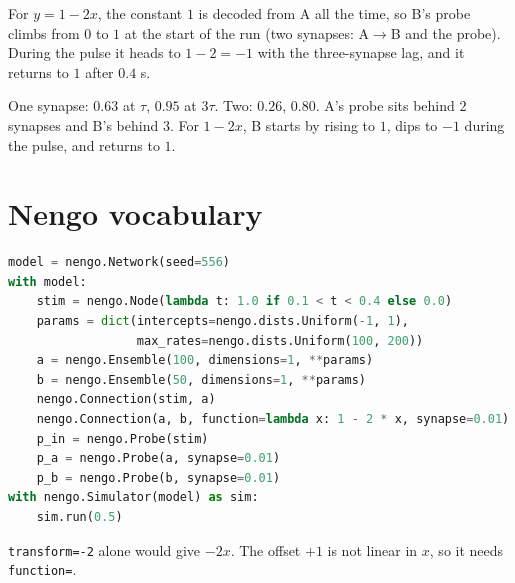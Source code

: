 \documentclass[11pt,letterpaper]{article}
\newcommand{\ans}[1]{\par\vspace{4pt}{\bfseries #1}\quad}
\begin{document}
For $y = 1 - 2x$, the constant $1$ is decoded from A all the time, so B's probe climbs from $0$ to $1$ at the start of the run (two synapses: A$\to$B and the probe). During the pulse it heads to $1 - 2 = -1$ with the three-synapse lag, and it returns to $1$ after $0.4$ s.
\begin{center}
\end{center}
\begin{result}
One synapse: $0.63$ at $\tau$, $0.95$ at $3\tau$. Two: $0.26$, $0.80$. A's probe sits behind $2$ synapses and B's behind $3$. For $1 - 2x$, B starts by rising to $1$, dips to $-1$ during the pulse, and returns to $1$.
\end{result}

\section{Nengo vocabulary}

\ans{Q1}
\begin{lstlisting}[language=Python]
model = nengo.Network(seed=556)
with model:
    stim = nengo.Node(lambda t: 1.0 if 0.1 < t < 0.4 else 0.0)
    params = dict(intercepts=nengo.dists.Uniform(-1, 1),
                  max_rates=nengo.dists.Uniform(100, 200))
    a = nengo.Ensemble(100, dimensions=1, **params)
    b = nengo.Ensemble(50, dimensions=1, **params)
    nengo.Connection(stim, a)
    nengo.Connection(a, b, function=lambda x: 1 - 2 * x, synapse=0.01)
    p_in = nengo.Probe(stim)
    p_a = nengo.Probe(a, synapse=0.01)
    p_b = nengo.Probe(b, synapse=0.01)
with nengo.Simulator(model) as sim:
    sim.run(0.5)
\end{lstlisting}
\texttt{transform=-2} alone would give $-2x$. The offset $+1$ is not linear in $x$, so it needs \texttt{function=}.
\end{document}
